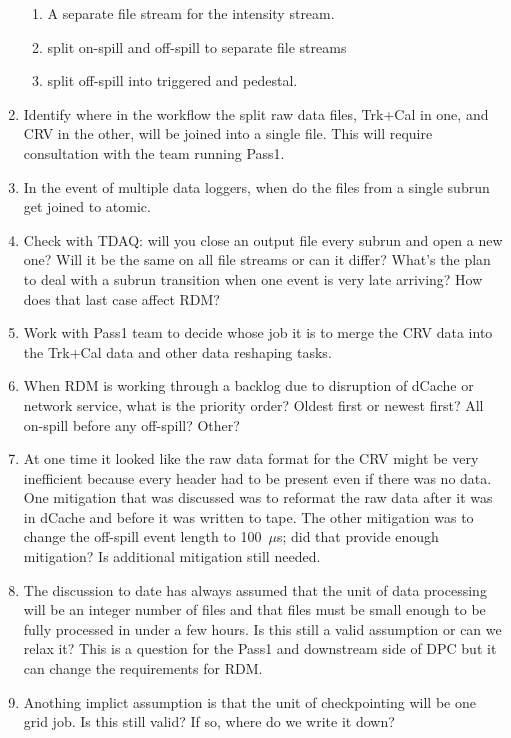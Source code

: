 \begin{enumerate}
\begin{enumerate}
    \item A separate file stream for the intensity stream.
    \item split on-spill and off-spill to separate file streams
    \item split off-spill into triggered and pedestal.
  \end{enumerate}
\item Identify where in the workflow the split raw data files, Trk+Cal in one,
  and CRV in the other, will be joined into a single file.  This will require consultation with the team running
  Pass1.
\item In the event of multiple data loggers, when do the files from a single subrun get joined to atomic.
\item Check with TDAQ: will you close an output file every subrun and open a new one? Will it be the same
  on all file streams or can it differ?  What's the plan to deal with a subrun transition when one
  event is very late arriving?  How does that last case affect RDM?
\item Work with Pass1 team to decide whose job it is to merge the CRV data into the Trk+Cal data and other
     data reshaping tasks.
\item When RDM is working through a backlog due to disruption of dCache or network service, what is the priority
  order?  Oldest first or newest first?  All on-spill before any off-spill?  Other?
\item At one time it looked like the raw data format for the CRV might be very inefficient
  because every header had to be present even if there was no data.
  One mitigation that was discussed was to reformat the raw data after it was in dCache and before it was written to tape.
  The other mitigation was to change the off-spill event length to 100~$\mu$s; did that provide enough mitigation?
  Is additional mitigation still needed.
\item The discussion to date has always assumed that the unit of data processing will be an integer number of files
  and that files must be small enough to be fully processed in under a few hours.  Is this still a valid assumption
  or can we relax it?  This is a question for the Pass1 and downstream side of DPC but it can change the requirements for RDM.
\item Anothing implict assumption is that the unit of checkpointing will be one grid job. Is this still valid?
  If so, where do we write it down?
\end{enumerate}


